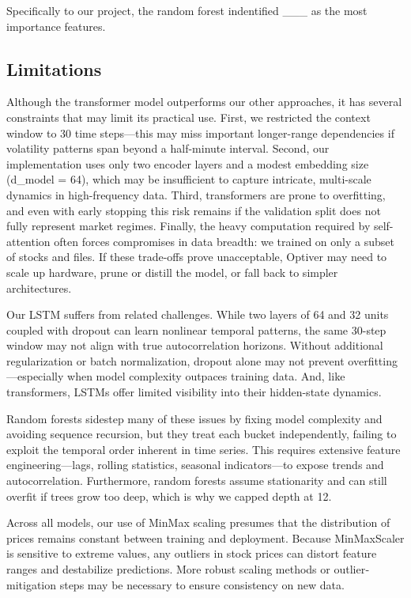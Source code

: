 \documentclass[
  letterpaper,
  DIV=11,
  numbers=noendperiod]{scrartcl}
\begin{document}
Specifically to our project, the random forest indentified \_\_\_ as the
most importance features.

\subsection{Limitations}\label{limitations}

Although the transformer model outperforms our other approaches, it has
several constraints that may limit its practical use. First, we
restricted the context window to 30 time steps---this may miss important
longer-range dependencies if volatility patterns span beyond a
half-minute interval. Second, our implementation uses only two encoder
layers and a modest embedding size (d\_model = 64), which may be
insufficient to capture intricate, multi-scale dynamics in
high-frequency data. Third, transformers are prone to overfitting, and
even with early stopping this risk remains if the validation split does
not fully represent market regimes. Finally, the heavy computation
required by self-attention often forces compromises in data breadth: we
trained on only a subset of stocks and files. If these trade-offs prove
unacceptable, Optiver may need to scale up hardware, prune or distill
the model, or fall back to simpler architectures.

Our LSTM suffers from related challenges. While two layers of 64 and 32
units coupled with dropout can learn nonlinear temporal patterns, the
same 30-step window may not align with true autocorrelation horizons.
Without additional regularization or batch normalization, dropout alone
may not prevent overfitting---especially when model complexity outpaces
training data. And, like transformers, LSTMs offer limited visibility
into their hidden-state dynamics.

Random forests sidestep many of these issues by fixing model complexity
and avoiding sequence recursion, but they treat each bucket
independently, failing to exploit the temporal order inherent in time
series. This requires extensive feature engineering---lags, rolling
statistics, seasonal indicators---to expose trends and autocorrelation.
Furthermore, random forests assume stationarity and can still overfit if
trees grow too deep, which is why we capped depth at 12.

Across all models, our use of MinMax scaling presumes that the
distribution of prices remains constant between training and deployment.
Because MinMaxScaler is sensitive to extreme values, any outliers in
stock prices can distort feature ranges and destabilize predictions.
More robust scaling methods or outlier‐mitigation steps may be necessary
to ensure consistency on new data.
\end{document}
